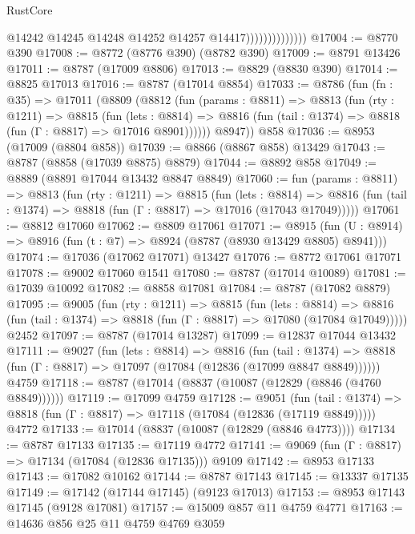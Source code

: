 \begin{lexlean}{RustCore}
\begin{coremodule}
                                @14242
                                @14245
                                @14248
                                @14252
                                @14257
                                @14417))))))))))))))
@17004 := @8770 @390
@17008 := @8772 (@8776 @390) (@8782 @390)
@17009 := @8791 @13426
@17011 := @8787 (@17009 @8806)
@17013 := @8829 (@8830 @390)
@17014 := @8825 @17013
@17016 := @8787 (@17014 @8854)
@17033 := @8786
    (fun (fn : @35) =>
    @17011
      (@8809
        (@8812
          (fun (params : @8811) =>
          @8813
            (fun (rty : @1211) =>
            @8815
              (fun (lets : @8814) =>
              @8816 (fun (tail : @1374) => @8818 (fun (Γ : @8817) => @17016 @8901))))))
        @8947))
    @858
@17036 := @8953 (@17009 (@8804 @858))
@17039 := @8866 (@8867 @858) @13429
@17043 := @8787 (@8858 (@17039 @8875) @8879)
@17044 := @8892 @858
@17049 := @8889 (@8891 @17044 @13432 @8847 @8849)
@17060 := fun (params : @8811) =>
  @8813
    (fun (rty : @1211) =>
    @8815
      (fun (lets : @8814) =>
      @8816 (fun (tail : @1374) => @8818 (fun (Γ : @8817) => @17016 (@17043 @17049)))))
@17061 := @8812 @17060
@17062 := @8809 @17061
@17071 := @8915
    (fun (U : @8914) => @8916 (fun (t : @7) => @8924 (@8787 (@8930 @13429 @8805) @8941)))
@17074 := @17036 (@17062 @17071) @13427
@17076 := @8772 @17061 @17071
@17078 := @9002 @17060 @1541
@17080 := @8787 (@17014 @10089)
@17081 := @17039 @10092
@17082 := @8858 @17081
@17084 := @8787 (@17082 @8879)
@17095 := @9005
    (fun (rty : @1211) =>
    @8815
      (fun (lets : @8814) =>
      @8816 (fun (tail : @1374) => @8818 (fun (Γ : @8817) => @17080 (@17084 @17049)))))
    @2452
@17097 := @8787 (@17014 @13287)
@17099 := @12837 @17044 @13432
@17111 := @9027
    (fun (lets : @8814) =>
    @8816
      (fun (tail : @1374) =>
      @8818 (fun (Γ : @8817) => @17097 (@17084 (@12836 (@17099 @8847 @8849))))))
    @4759
@17118 := @8787 (@17014 (@8837 (@10087 (@12829 (@8846 (@4760 @8849))))))
@17119 := @17099 @4759
@17128 := @9051
    (fun (tail : @1374) => @8818 (fun (Γ : @8817) => @17118 (@17084 (@12836 (@17119 @8849)))))
    @4772
@17133 := @17014 (@8837 (@10087 (@12829 (@8846 @4773))))
@17134 := @8787 @17133
@17135 := @17119 @4772
@17141 := @9069 (fun (Γ : @8817) => @17134 (@17084 (@12836 @17135))) @9109
@17142 := @8953 @17133
@17143 := @17082 @10162
@17144 := @8787 @17143
@17145 := @13337 @17135
@17149 := @17142 (@17144 @17145) (@9123 @17013)
@17153 := @8953 @17143 @17145 (@9128 @17081)
@17157 := @15009 @857 @11 @4759 @4771
@17163 := @14636 @856 @25 @11 @4759 @4769 @3059

\end{coremodule}
\end{lexlean}
